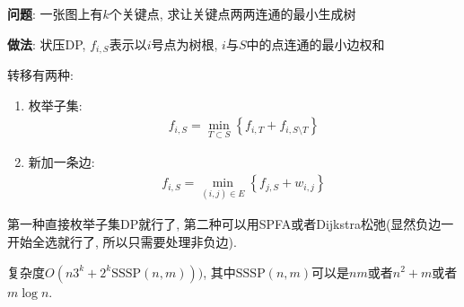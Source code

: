 {\bfseries 问题}: 一张图上有$k$个关键点, 求让关键点两两连通的最小生成树

{\bfseries 做法}: 状压DP, $f_{i,S}$表示以$i$号点为树根, $i$与$S$中的点连通的最小边权和

转移有两种:
\begin{enumerate}
	\item 枚举子集: $$\begin{aligned}f_{i, S} = \min_{T\subset S} \left\{f_{i, T} + f_{i, S\setminus T}\right\}\end{aligned}$$
	\item 新加一条边: $$\begin{aligned}f_{i, S} = \min_{(i, j)\in E} \left\{f_{j, S} + w_{i, j}\right\}\end{aligned}$$
\end{enumerate}
第一种直接枚举子集DP就行了, 第二种可以用SPFA或者Dijkstra松弛(显然负边一开始全选就行了, 所以只需要处理非负边).

复杂度$O(n 3^k + 2^k \text{SSSP}(n, m)))$, 其中$\text{SSSP}(n,m)$可以是$nm$或者$n^2+m$或者$m\log n$.

\inputminted{cpp}{../src/graph/steiner.cpp}